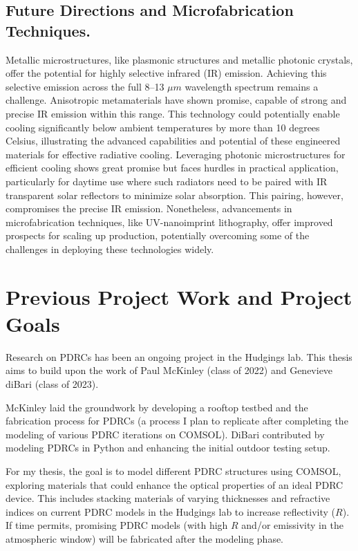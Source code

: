 \subsection{Future Directions and Microfabrication Techniques.}
Metallic microstructures, like plasmonic structures and metallic photonic crystals, offer the potential for highly selective infrared (IR) emission. Achieving this selective emission across the full 8–13 $\mu m$ wavelength spectrum remains a challenge. Anisotropic metamaterials have shown promise, capable of strong and precise IR emission within this range. This technology could potentially enable cooling significantly below ambient temperatures by more than 10 degrees Celsius, illustrating the advanced capabilities and potential of these engineered materials for effective radiative cooling.
Leveraging photonic microstructures for efficient cooling shows great promise but faces hurdles in practical application, particularly for daytime use where such radiators need to be paired with IR transparent solar reflectors to minimize solar absorption. This pairing, however, compromises the precise IR emission. Nonetheless, advancements in microfabrication techniques, like UV-nanoimprint lithography, offer improved prospects for scaling up production, potentially overcoming some of the challenges in deploying these technologies widely.




\section{Previous Project Work and Project Goals}
Research on PDRCs has been an ongoing project in the Hudgings lab. This thesis aims to build upon the work of Paul McKinley (class of 2022) and Genevieve diBari (class of 2023).

McKinley laid the groundwork by developing a rooftop testbed and the fabrication process for PDRCs (a process I plan to replicate after completing the modeling of various PDRC iterations on COMSOL). DiBari contributed by modeling PDRCs in Python and enhancing the initial outdoor testing setup.

For my thesis, the goal is to model different PDRC structures using COMSOL, exploring materials that could enhance the optical properties of an ideal PDRC device. This includes stacking materials of varying thicknesses and refractive indices on current PDRC models in the Hudgings lab to increase reflectivity ($R$). If time permits, promising PDRC models (with high $R$ and/or emissivity in the atmospheric window) will be fabricated after the modeling phase.
